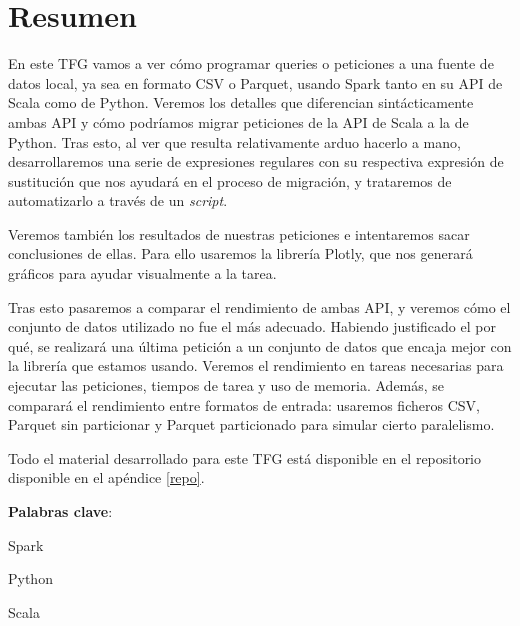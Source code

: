 \documentclass[12pt,twoside,titlepage]{report}
\newcommand\blankpage{%
    \newpage
    \null
    \thispagestyle{empty}%
    \newpage}
\begin{document}
\afterpage{\blankpage}








\chapter*{Resumen}

En este TFG vamos a ver cómo programar queries o peticiones a una fuente de datos local, ya sea en formato CSV o Parquet, usando Spark tanto en su API de Scala como de Python. Veremos los detalles que diferencian sintácticamente ambas API y cómo podríamos migrar peticiones de la API de Scala a la de Python. Tras esto, al ver que resulta relativamente arduo hacerlo a mano, desarrollaremos una serie de expresiones regulares con su respectiva expresión de sustitución que nos ayudará en el proceso de migración, y trataremos de automatizarlo a través de un \textit{script}.

Veremos también los resultados de nuestras peticiones e intentaremos sacar conclusiones de ellas. Para ello usaremos la librería Plotly, que nos generará gráficos para ayudar visualmente a la tarea.

Tras esto pasaremos a comparar el rendimiento de ambas API, y veremos cómo el conjunto de datos utilizado no fue el más adecuado. Habiendo justificado el por qué, se realizará una última petición a un conjunto de datos que encaja mejor con la librería que estamos usando. Veremos el rendimiento en tareas necesarias para ejecutar las peticiones, tiempos de tarea y uso de memoria. Además, se comparará el rendimiento entre formatos de entrada: usaremos ficheros CSV, Parquet sin particionar y Parquet particionado para simular cierto paralelismo.

Todo el material desarrollado para este TFG está disponible en el repositorio disponible en el apéndice \ref{repo}.


\mbox{} \bigskip

\noindent \textbf{Palabras clave}:
\begin{compactitem}
    \item Spark
    \item Python
    \item Scala
\end{compactitem}
\end{document}
